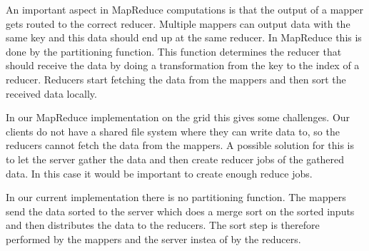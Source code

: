 An important aspect in MapReduce computations is that the output of a mapper
gets routed to the correct reducer.
Multiple mappers can output data with the same key and this data should end up
at the same reducer.
In MapReduce this is done by the partitioning function. This function determines
the reducer that should receive the data by doing a transformation from the key
to the index of a reducer. Reducers start fetching the data from the mappers and
then sort the received data locally.

In our MapReduce implementation on the grid this gives some challenges.
Our clients do not have a shared file system where they can write data to, so
the reducers cannot fetch the data from the mappers.
A possible solution for this is to let the server gather the data and then
create reducer jobs of the gathered data.
In this case it would be important to create enough reduce jobs.

In our current implementation there is no partitioning function. The mappers
send the data sorted to the server which does a merge sort on the sorted inputs
and then distributes the data to the reducers. The sort step is therefore
performed by the mappers and the server instea of by the reducers.